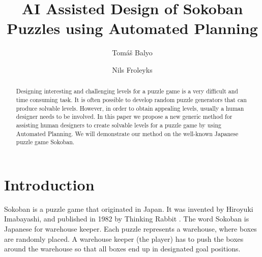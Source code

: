 \documentclass[runningheads]{llncs}
\begin{document}
%
\title{AI Assisted Design of Sokoban Puzzles using Automated Planning}
%
%
\author{Tom\'a\v{s} Balyo \and
Nils Froleyks}
%
%
%
\maketitle              %

\newcommand{\sokoimg}[1]{\texttt{[image: \#1]} \hspace{-0.30em}}

\newcommand{\w}{\sokoimg{figures/wall.pdf}}
\newcommand{\e}{\sokoimg{figures/empty.pdf}}
\newcommand{\p}{\sokoimg{figures/player.pdf}}
\newcommand{\x}{\sokoimg{figures/box.pdf}}
\newcommand{\g}{\sokoimg{figures/goal.pdf}}
\newcommand{\h}{\sokoimg{figures/goalbox.pdf}}
\newcommand{\n}{\\
\vspace{-0.1em}}

%
\begin{abstract}
Designing interesting and challenging levels for a puzzle game is a very difficult and time
consuming task. It is often possible to develop random puzzle generators that can produce
solvable levels. However, in order to obtain appealing levels, usually a human designer 
needs to be involved. In this paper we propose a new generic method for assisting human
designers to create solvable levels for a puzzle game by using Automated Planning. 
We will demonstrate our method on the well-known Japanese puzzle game Sokoban.

\end{abstract}
%
%
%
\section{Introduction}
Sokoban is a puzzle game that originated in Japan. It was invented by Hiroyuki
Imabayashi, and published in 1982 by Thinking Rabbit \cite{SokobanOfficial}.
The word Sokoban is Japanese for warehouse keeper.
Each puzzle represents a warehouse, where boxes are randomly placed. A warehouse
keeper (the player) has to push the boxes around the warehouse so that all boxes 
end up in designated goal positions.
\end{document}
